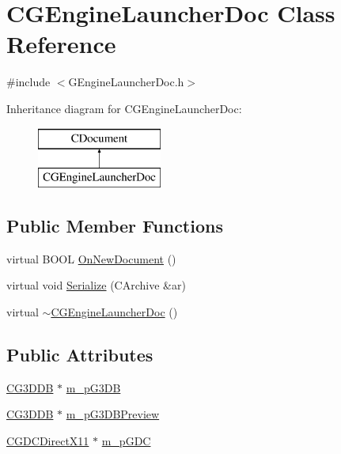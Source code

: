 \hypertarget{class_c_g_engine_launcher_doc}{}\section{C\+G\+Engine\+Launcher\+Doc Class Reference}
\label{class_c_g_engine_launcher_doc}


{\ttfamily \#include $<$G\+Engine\+Launcher\+Doc.\+h$>$}

Inheritance diagram for C\+G\+Engine\+Launcher\+Doc\+:\begin{figure}[H]
\begin{center}
\leavevmode
\includegraphics[height=2.000000cm]{class_c_g_engine_launcher_doc}
\end{center}
\end{figure}
\subsection*{Public Member Functions}
\begin{DoxyCompactItemize}
\item 
virtual B\+O\+O\+L \hyperlink{class_c_g_engine_launcher_doc_a1a6bc3c2794a01cd3e64f2eae62c4c88}{On\+New\+Document} ()
\item 
virtual void \hyperlink{class_c_g_engine_launcher_doc_a1bd70919cf9d9a3b32b08b9c8bf95fb6}{Serialize} (C\+Archive \&ar)
\item 
virtual \hyperlink{class_c_g_engine_launcher_doc_aaf3efe39117b69c3553df84e91402686}{$\sim$\+C\+G\+Engine\+Launcher\+Doc} ()
\end{DoxyCompactItemize}
\subsection*{Public Attributes}
\begin{DoxyCompactItemize}
\item 
\hyperlink{class_c_g3_d_d_b}{C\+G3\+D\+D\+B} $\ast$ \hyperlink{class_c_g_engine_launcher_doc_a00e42831c5d3dfb9766d2b652099b977}{m\+\_\+p\+G3\+D\+B}
\item 
\hyperlink{class_c_g3_d_d_b}{C\+G3\+D\+D\+B} $\ast$ \hyperlink{class_c_g_engine_launcher_doc_aa2dd694dffbc1da4fe9a59a0dfe54337}{m\+\_\+p\+G3\+D\+B\+Preview}
\item 
\hyperlink{class_c_g_d_c_direct_x11}{C\+G\+D\+C\+Direct\+X11} $\ast$ \hyperlink{class_c_g_engine_launcher_doc_a9d7b6413c974d317a5e6e73b422ef1ee}{m\+\_\+p\+G\+D\+C}
\end{DoxyCompactItemize}
